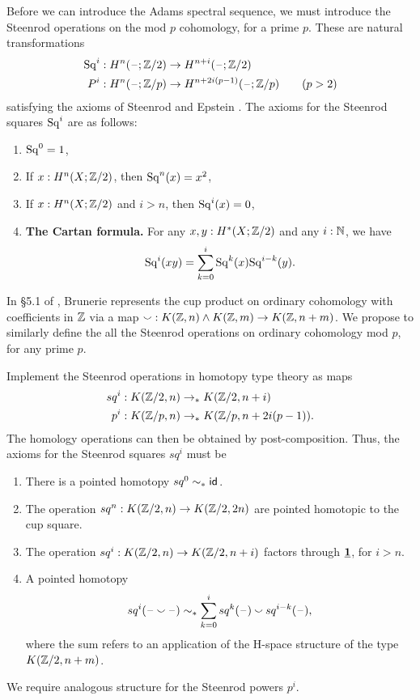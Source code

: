 \documentclass[reqno]{amsart}
\begin{document}
Before we can introduce the Adams spectral sequence, we must introduce the
Steenrod operations on the mod $p$ cohomology, for a prime $p$.
These are natural transformations
\begin{align*}
\mathrm{Sq}^{i} & : H^n(\mathord{\hspace{1pt}\text{--}\hspace{1pt}};\mathbb{Z}/2) \to H^{n+i}(\mathord{\hspace{1pt}\text{--}\hspace{1pt}};\mathbb{Z}/2) \\
P^i & : H^n(\mathord{\hspace{1pt}\text{--}\hspace{1pt}};\mathbb{Z}/p) \to H^{n+2i(p-1)}(\mathord{\hspace{1pt}\text{--}\hspace{1pt}};\mathbb{Z}/p)\tag{$p>2$}
\end{align*}
satisfying the axioms of Steenrod and Epstein \cite{Steenrod62}. The axioms for the Steenrod squares $\mathrm{Sq}^{i}$
are as follows:
\begin{enumerate}
\item $\mathrm{Sq}^{0}=1$,
\item If $x:H^n(X;\mathbb{Z}/2)$, then $\mathrm{Sq}^{n}(x)=x^2$,
\item If $x:H^n(X;\mathbb{Z}/2)$ and $i>n$, then $\mathrm{Sq}^{i}(x)=0$,
\item \textbf{The Cartan formula.} For any $x,y:H^\ast(X;\mathbb{Z}/2)$ and any $i:\mathbb{N}$, we have
\begin{equation*}
\mathrm{Sq}^{i}(xy)=\sum_{k=0}^i \mathrm{Sq}^{k}(x)\mathrm{Sq}^{i-k}(y).
\end{equation*}
\end{enumerate}

In \S 5.1 of \cite{Brunerie16}, Brunerie represents the cup product on ordinary cohomology
with coefficients in $\mathbb{Z}$ via a map ${\smallsmile} : K(\mathbb{Z},n) \wedge K(\mathbb{Z},m)\to
K(\mathbb{Z},n+m)$. We propose to similarly define the all the Steenrod operations on ordinary cohomology
mod $p$, for any prime $p$.

\begin{proposal}\label{p:steenrod_operations}
Implement the Steenrod operations in homotopy type theory as maps
\begin{align*}
sq^i & : K(\mathbb{Z}/2,n) \to_\ast K(\mathbb{Z}/2,n+i) \\
p^i & : K(\mathbb{Z}/p,n)\to_\ast K(\mathbb{Z}/p,n+2i(p-1)).
\end{align*}
The homology operations can then be obtained by post-composition. Thus, the
axioms for the Steenrod squares $sq^i$ must be
\begin{enumerate}
\item There is a pointed homotopy $sq^0\sim_\ast\mathsf{id}_{}$.
\item The operation $sq^n:K(\mathbb{Z}/2,n)\to K(\mathbb{Z}/2,2n)$ are pointed homotopic to
the cup square.
\item The operation $sq^i:K(\mathbb{Z}/2,n)\to K(\mathbb{Z}/2,n+i)$ factors through $\underline{\mathbf{1}}$,
for $i>n$. 
\item A pointed homotopy
\begin{equation*}
sq^i(\mathord{\hspace{1pt}\text{--}\hspace{1pt}} \mathbin{\smallsmile} \mathord{\hspace{1pt}\text{--}\hspace{1pt}})\sim_\ast \sum_{k=0}^i sq^k(\mathord{\hspace{1pt}\text{--}\hspace{1pt}}) \mathbin{\smallsmile} sq^{i-k}(\mathord{\hspace{1pt}\text{--}\hspace{1pt}}),
\end{equation*}
where the sum refers to an application of the H-space structure of the type $K(\mathbb{Z}/2,n+m)$. 
\end{enumerate}
We require analogous structure for the Steenrod powers $p^i$. 
\end{proposal}
\end{document}
